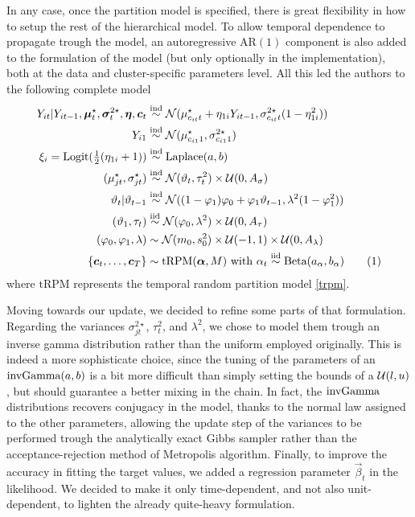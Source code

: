 \documentclass[12pt,	%
	a4paper,		%
	twoside,		%
	openright,		%
	titlepage,%
	]{book}
\theoremstyle{definition}
\begin{document}
In any case, once the partition model is specified, there is great flexibility in how to setup the rest of the hierarchical model. To allow temporal dependence to propagate trough the model, an autoregressive $\text{AR}(1)$ component is also added to the formulation of the model (but only optionally in the implementation), both at the data and cluster-specific parameters level. All this led the authors to the following complete model
\begin{align*}
Y_{it}|Y_{it-1},\vec{\mu}^{\star}_t,\vec{\sigma}^{2\star}_t, \vec{\eta},\vec{c}_t &\simind \mathcal{N}(\mu_{c_{it}t}^\star+\eta_{1i}Y_{it-1},\sigma^{2\star}_{c_{it}t}(1-\eta_{1i}^2)) \\
Y_{i1} &\simind \mathcal{N}(\mu^\star_{c_{i1}1},\sigma^{2\star}_{c_{i1}1})\\
%
\xi_i = \text{Logit$(\tfrac{1}{2}(\eta_{1i}+1)$}) &\simind \text{Laplace$(a,b)$}\\
%
( \mu_{jt}^\star, \sigma_{jt}^\star) &\simind \N(\theta_t,\tau_t^2) \times \U(0,A_\sigma)\\
%
\theta_t | \theta_{t-1} &\simind \N((1-\phi_1)\phi_0 + \phi_1\theta_{t-1},\lambda^2(1-\phi_1^2))\\
%
(\theta_1,\tau_t) &\simiid \N(\phi_0,\lambda^2) \times \U(0,A_\tau)\\
%
(\phi_0,\phi_1,\lambda) &\sim \N(m_0,s_0^2) \times \U(-1,1) \times \U(0,A_\lambda)\\
%
\{\vec{c}_t, \ldots, \vec{c}_T\} &\sim \text{tRPM}(\vec{\alpha}, M) \text{ with } \alpha_t \simiid \text{Beta}(a_\alpha, b_\alpha)
\tag{\stepcounter{equation}\theequation}
\end{align*}
where $\text{tRPM}$ represents the temporal random partition model \eqref{trpm}.

Moving towards our update, we decided to refine some parts of that formulation. Regarding the variances $\sigma^{2\star}_{jt}$, $\tau^2_t$, and $\lambda^2$, we chose to model them trough an inverse gamma distribution rather than the uniform employed originally. This is indeed a more sophisticate choice, since the tuning of the parameters of an $\text{invGamma}(a,b)$ is a bit more difficult than simply setting the bounds of a $\mathcal{U}(l,u)$, but should guarantee a better mixing in the chain. In fact, the $\text{invGamma}$ distributions recovers conjugacy in the model, thanks to the normal law assigned to the other parameters, allowing the update step of the variances to be performed trough the analytically exact Gibbs sampler rather than the acceptance-rejection method of Metropolis algorithm. Finally, to improve the accuracy in fitting the target values, we added a regression parameter $\vec{\beta}_t$ in the likelihood. We decided to make it only time-dependent, and not also unit-dependent, to lighten the already quite-heavy formulation.
\end{document}
